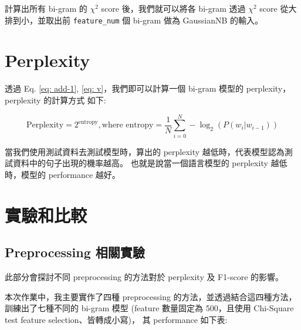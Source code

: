 \documentclass{article}[12pt]
\begin{document}
計算出所有 bi-gram 的 $\chi^2$ score 後，我們就可以將各 bi-gram 透過 $\chi^2$ score 從大
排到小，並取出前 \texttt{feature\_num} 個 bi-gram 做為 GaussianNB 的輸入。

\section{Perplexity}
透過 Eq. \ref{eq: add-1}, \ref{eq: v}，我們即可以計算一個 bi-gram 模型的 perplexity，perplexity 的計算方式
如下:

\begin{equation}
    \text{Perplexity} = 2^{\text{entropy}}, \text{where entropy} = \frac{1}{N} \sum^{N}_{i=0} -\log_{2}(P(w_i|w_{i-1}))
\end{equation}

當我們使用測試資料去測試模型時，算出的 perplexity 越低時，代表模型認為測試資料中的句子出現的機率越高。
也就是說當一個語言模型的 perplexity 越低時，模型的 performance 越好。

\section{實驗和比較}

\subsection{Preprocessing 相關實驗}
此部分會探討不同 preprocessing 的方法對於 perplexity 及 F1-score
的影響。

本次作業中，我主要實作了四種 preprocessing 的方法，並透過結合這四種方法，訓練出了七種不同的 bi-gram 模型 
(feature 數量固定為 500，且使用 Chi-Square test feature selection、皆轉成小寫)，
其 performance 如下表:
\end{document}
